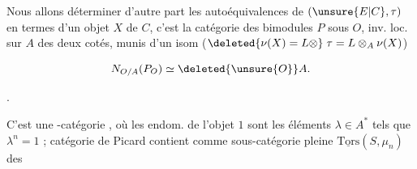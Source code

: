 Nous allons déterminer d'autre part les autoéquivalences de $(\unsure{E|C},\tau)$ \unsure{;}
en termes d'un objet $X$ de $C$, 
c'est la catégorie des  bimodules
$P$ sous $O$, inv. loc. sur $A$ des deux cotés,
munis d'un isom  ($\deleted{\nu(X)=L\otimes}\;\tau=L\otimes_A\nu(X)$)

\[
 N_{O/A}(P_O)\simeq\deleted{\unsure{O}} A.
\]


.

C'est une -catégorie , où les endom.
de l'objet $1$ sont les éléments $\lambda\in A^*$ tels que $\lambda^n=1$ ;
 catégorie de Picard contient comme sous-catégorie pleine $\underline{\mathrm{Tors}}(S,\mu_n)$ des
